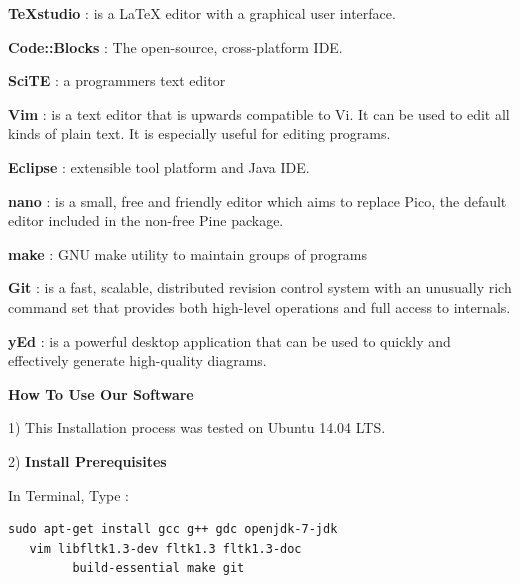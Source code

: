 \documentclass{slides}
\begin{document}
\begin{center}
\textbf{TeXstudio} : is a LaTeX editor with a graphical user  interface.
\end{center}
\begin{center}
\textbf{Code::Blocks} : The open-source, cross-platform IDE.
\end{center}
\begin{center}
\textbf{SciTE} : a programmers text editor
\end{center}
\begin{center}
\textbf{Vim} : is a text editor that is upwards compatible to Vi.  It can be used to edit all kinds of plain text.  It is especially useful  for editing programs.
\end{center}
\newpage
\begin{center}
\textbf{Eclipse} : extensible tool platform and Java IDE.
\end{center}
\begin{center}
\textbf{ nano} : is  a small, free and friendly editor which aims to replace Pico, the default editor included in the non-free Pine package.
\end{center}
\begin{center}
\textbf{make} : GNU make utility to maintain groups of programs
\end{center}
\begin{center}
\textbf{Git} : is a fast, scalable, distributed revision control system with an unusually rich command set that provides both high-level operations and full access to internals.
\end{center}
\begin{center}
\textbf{yEd} : is a powerful desktop application that can be used to quickly and effectively generate high-quality diagrams.
\end{center}
\newpage
\begin{center}
\textbf{\Large How To Use Our Software}
\end{center}
\begin{center}
1) This Installation process was tested on Ubuntu 14.04 LTS.
\end{center}
\begin{center}
2) \textbf{Install Prerequisites}
\begin{center}
In Terminal, Type :
\end{center}
\begin{BVerbatim}
sudo apt-get install gcc g++ gdc openjdk-7-jdk
   vim libfltk1.3-dev fltk1.3 fltk1.3-doc
         build-essential make git 
\end{BVerbatim}
\end{center}
\end{document}

